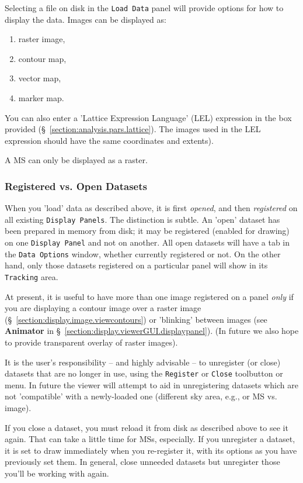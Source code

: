 Selecting a file on disk in the {\tt Load Data} panel will
provide options for how to display the data. Images can be displayed
as: 
\begin{enumerate}
\item raster image, 
\item contour map, 
\item vector map,
\item marker map.  
\end{enumerate}

You can also enter a 'Lattice Expression Language' (LEL) expression in the
box provided (\S~\ref{section:analysis.pars.lattice}). The images used in the
LEL expression should have the same coordinates and extents).

A MS can only be displayed as a raster.


\subsubsection{Registered vs. Open Datasets}
\label{section:display.viewerGUI.load.register}

When you 'load' data as described above, it is first {\em opened}, and then
{\em registered} on all existing {\tt Display Panels}.  The distinction
is subtle.  An 'open' dataset has been prepared in memory from disk; it
may be registered (enabled for drawing) on one {\tt Display Panel} and not
on another.  All open datasets will have a tab in the {\tt Data Options}
window, whether currently registered or not.  On the other hand, only those
datasets registered on a particular panel will show in its {\tt Tracking}
area.

At present, it is useful to have more than one image registered on a
panel {\em only} if you are displaying a contour image over a raster image
(\S~\ref{section:display.image.viewcontours}) or 'blinking' between images
(see {\bf Animator} in \S~\ref{section:display.viewerGUI.displaypanel}).
(In future we also hope to provide transparent overlay of raster images).

It is the user's responsibility -- and highly advisable -- to unregister
(or close) datasets that are no longer in use, using the {\tt Register}
or {\tt Close} toolbutton or menu.  In future the viewer will attempt
to aid in unregistering datasets which are not 'compatible' with a
newly-loaded one (different sky area, e.g., or MS vs. image).

If you close a dataset, you must reload it from disk as described above
to see it again.  That can take a little time for MSs, especially.  If you
unregister a dataset, it is set to draw immediately when you re-register it,
with its options as you have previously set them.  In general, close
unneeded datasets but unregister those you'll be working with again.

